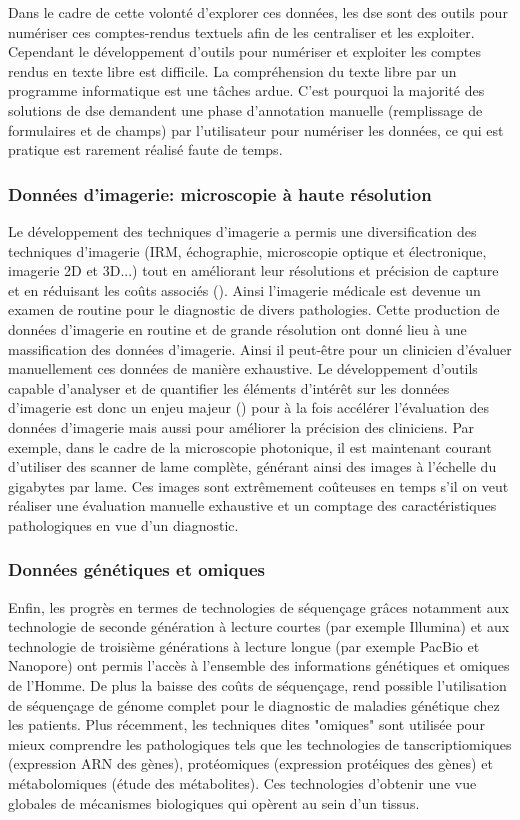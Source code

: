 Dans le cadre de cette volonté d'explorer ces données, les \gls{dse} sont des outils pour numériser ces comptes-rendus textuels afin de les centraliser et les exploiter. Cependant le développement d'outils pour numériser et exploiter les comptes rendus en texte libre est difficile. La compréhension du texte libre par un programme informatique est une tâches ardue. C'est pourquoi la majorité des solutions de \gls{dse} demandent une phase d'annotation manuelle (remplissage de formulaires et de champs) par l'utilisateur pour numériser les données, ce qui est pratique est rarement réalisé faute de temps.

\subsubsection{Données d'imagerie: microscopie à haute résolution}
Le développement des techniques d'imagerie a permis une diversification des techniques d'imagerie (IRM, échographie, microscopie optique et électronique, imagerie 2D et 3D...) tout en améliorant leur résolutions et précision de capture  et en réduisant les coûts associés (\cite{abdallah_history_2017, prakash_super-resolution_2022, sheppard_structured_2021}). Ainsi l'imagerie médicale est devenue un examen de routine pour le diagnostic de divers pathologies. Cette production de données d'imagerie en routine et de grande résolution ont donné lieu à une massification des données d'imagerie. Ainsi il peut-être pour un clinicien d'évaluer manuellement ces données de manière exhaustive. Le développement d'outils capable d'analyser et de quantifier les éléments d'intérêt sur les données d'imagerie est donc un enjeu majeur (\cite{tchito_tchapga_biomedical_2021}) pour à la fois accélérer l'évaluation des données d'imagerie mais aussi pour améliorer la précision des cliniciens. Par exemple, dans le cadre de la microscopie photonique, il est maintenant courant d'utiliser des scanner de lame complète, générant ainsi des images à l'échelle du gigabytes par lame. Ces images sont extrêmement coûteuses en temps s'il on veut réaliser une évaluation manuelle exhaustive et un comptage des caractéristiques pathologiques en vue d'un diagnostic.

\subsubsection{Données génétiques et omiques}
Enfin, les progrès en termes de technologies de séquençage grâces notamment aux technologie de seconde génération à lecture courtes (par exemple Illumina) et aux technologie de troisième générations à lecture longue (par exemple PacBio et Nanopore) ont permis l'accès à l'ensemble des informations génétiques et omiques de l'Homme. De plus la baisse des coûts de séquençage, rend possible l'utilisation de séquençage de génome complet pour le diagnostic de maladies génétique chez les patients. Plus récemment, les techniques dites "omiques" sont utilisée pour mieux comprendre les pathologiques tels que les technologies de tanscriptiomiques (expression ARN des gènes), protéomiques (expression protéiques des gènes) et métabolomiques (étude des métabolites). Ces technologies d'obtenir une vue globales de mécanismes biologiques qui opèrent au sein d'un tissus. 

